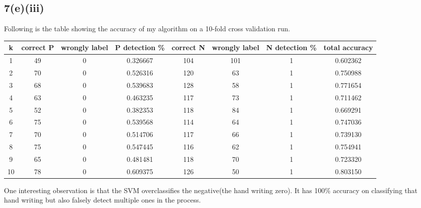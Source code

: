 \subsection*{7(e)(iii)}
Following is the table showing the accuracy of my algorithm on a 10-fold cross validation run.\\
\begin{centering}
\begin{tabular}{|c|c|c|c|c|c|c|c|}
\hline
k & correct P & wrongly label & P detection \% & correct N & wrongly label & N detection \% & total accuracy \\ \hline
1 & 49 & 0 & 0.326667 & 104 & 101 & 1 & 0.602362 \\ \hline 
2 & 70 & 0 & 0.526316 & 120 & 63 & 1 &0.750988 \\ \hline 
3 & 68 & 0 & 0.539683 & 128 & 58 & 1 &0.771654 \\ \hline 
4 & 63 & 0 & 0.463235 & 117 & 73 & 1 &0.711462 \\ \hline 
5 & 52 & 0 & 0.382353 & 118 & 84 & 1 &0.669291 \\ \hline 
6 & 75 & 0 & 0.539568 & 114 & 64 & 1 &0.747036 \\ \hline 
7 & 70 & 0 & 0.514706 & 117 & 66 & 1 &0.739130 \\ \hline 
8 & 75 & 0 & 0.547445 & 116 & 62 & 1 &0.754941 \\ \hline 
9 & 65 & 0 & 0.481481 & 118 & 70 & 1 &0.723320 \\ \hline 
10 & 78 & 0 & 0.609375 & 126 & 50 & 1 &0.803150 \\ \hline 
\end{tabular}
\end{centering}
One interesting observation is that the SVM overclassifies the negative(the hand writing zero). It has 100\% accuracy on classifying that hand writing but also falsely detect multiple ones in the process.
